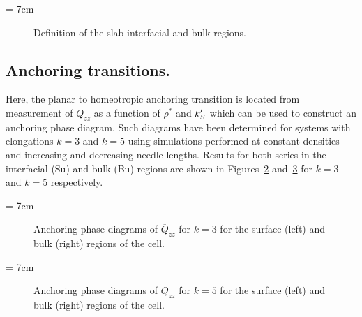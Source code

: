 \picW = 7cm
\begin{figure}[h]
	\centering
	\caption{Definition of the slab interfacial and bulk regions.}
	\label{fig:SuBuDefs}
\end{figure}

\subsection{Anchoring transitions.}

Here, the planar to homeotropic anchoring transition is located from measurement of 
$\overline{Q}_{zz}$ as a function of $\rho^{*}$ and $k_S^{\prime}$ which can be used to construct an 
anchoring phase diagram. Such diagrams have been determined for systems with elongations 
$k=3$ and $k=5$ using 
simulations performed at constant densities and increasing and decreasing needle lengths. 
Results for both series in the interfacial (Su) and bulk (Bu) regions are shown in 
Figures~\ref{fig:QzzPhaseDia_k3} and~\ref{fig:QzzPhaseDia_k5} for $k=3$ and $k=5$ respectively.

\picW = 7cm
\begin{figure}
	\centering
	
	
	\caption{Anchoring phase diagrams of $\overline{Q}_{zz}$ for $k=3$ for the surface 
	(left) and bulk (right) regions of the cell. }
	\label{fig:QzzPhaseDia_k3}
\end{figure}

\picW = 7cm
\begin{figure}
	\centering
	
	
	\caption{Anchoring phase diagrams of $\overline{Q}_{zz}$ for $k=5$ for the surface 
	(left) and bulk (right) regions of the cell. }
	\label{fig:QzzPhaseDia_k5}
\end{figure}

